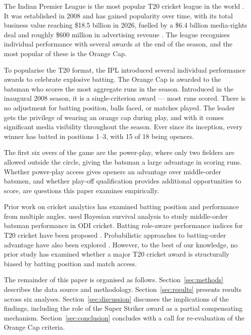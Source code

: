 \documentclass[11pt]{article}
\begin{document}
The Indian Premier League is the most popular T20 cricket league in the world
\citep{iplvaluation2026}. It was established in 2008 and has gained popularity over
time, with its total business value reaching \$18.5 billion in 2026, fuelled by a
\$6.4 billion media-rights deal and roughly \$600 million in advertising revenue
\citep{iplmediarights}. The league recognises individual performance with several
awards at the end of the season, and the most popular of these is the Orange Cap.

To popularise the T20 format, the IPL introduced several individual performance
awards to celebrate explosive batting. The Orange Cap is awarded to the batsman who
scores the most aggregate runs in the season. Introduced in the inaugural 2008
season, it is a single-criterion award --- most runs scored. There is no adjustment
for batting position, balls faced, or matches played. The leader gets the privilege
of wearing an orange cap during play, and with it comes significant media visibility
throughout the season. Ever since its inception, every winner has batted in positions
1--3, with 15 of 18 being openers.

The first six overs of the game are the power-play, where only two fielders are
allowed outside the circle, giving the batsman a large advantage in scoring runs.
Whether power-play access gives openers an advantage over middle-order batsmen, and
whether play-off qualification provides additional opportunities to score, are
questions this paper examines empirically.

Prior work on cricket analytics has examined batting position and performance from
multiple angles. \citet{pandey2023bayesian} used Bayesian survival analysis to study
middle-order batsman performance in ODI cricket. Batting role-aware performance
indices for T20 cricket have been proposed \citep{dppi2022}. Probabilistic approaches
to batting-order advantage have also been explored \citep{probabilistic2020}. However,
to the best of our knowledge, no prior study has examined whether a major T20 cricket
award is structurally biased by batting position and match access.

The remainder of this paper is organised as follows. Section~\ref{sec:methods}
describes the data source and methodology. Section~\ref{sec:results} presents results
across six analyses. Section~\ref{sec:discussion} discusses the implications of the
findings, including the role of the Super Striker award as a partial compensating
mechanism. Section~\ref{sec:conclusion} concludes with a call for re-evaluation of the
Orange Cap criteria.
\end{document}
